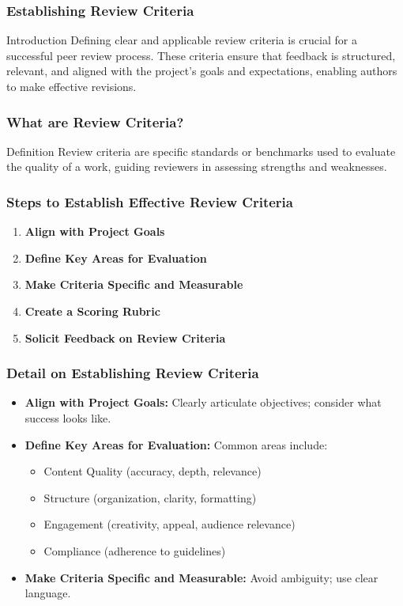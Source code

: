 \documentclass{beamer}
\begin{document}
\begin{frame}[fragile]
    \frametitle{Establishing Review Criteria}
    \begin{block}{Introduction}
        Defining clear and applicable review criteria is crucial for a successful peer review process. These criteria ensure that feedback is structured, relevant, and aligned with the project's goals and expectations, enabling authors to make effective revisions.
    \end{block}
\end{frame}

\begin{frame}[fragile]
    \frametitle{What are Review Criteria?}
    \begin{block}{Definition}
        Review criteria are specific standards or benchmarks used to evaluate the quality of a work, guiding reviewers in assessing strengths and weaknesses.
    \end{block}
\end{frame}

\begin{frame}[fragile]
    \frametitle{Steps to Establish Effective Review Criteria}
    \begin{enumerate}
        \item \textbf{Align with Project Goals}
        \item \textbf{Define Key Areas for Evaluation}
        \item \textbf{Make Criteria Specific and Measurable}
        \item \textbf{Create a Scoring Rubric}
        \item \textbf{Solicit Feedback on Review Criteria}
    \end{enumerate}
\end{frame}

\begin{frame}[fragile]
    \frametitle{Detail on Establishing Review Criteria}
    \begin{itemize}
        \item \textbf{Align with Project Goals:} Clearly articulate objectives; consider what success looks like.
        \item \textbf{Define Key Areas for Evaluation:} Common areas include:
        \begin{itemize}
            \item Content Quality (accuracy, depth, relevance)
            \item Structure (organization, clarity, formatting)
            \item Engagement (creativity, appeal, audience relevance)
            \item Compliance (adherence to guidelines)
        \end{itemize}
        \item \textbf{Make Criteria Specific and Measurable:} Avoid ambiguity; use clear language.
    \end{itemize}
\end{frame}
\end{document}
